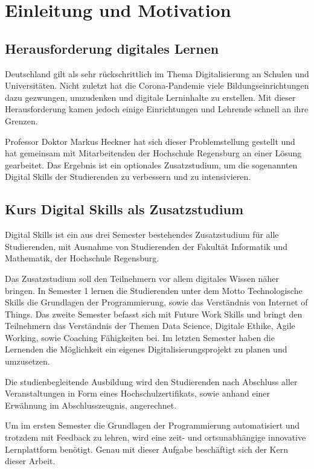 \section{Einleitung und Motivation}\label{einleitung}
\subsection{Herausforderung digitales Lernen}\label{herausforderung}
Deutschland gilt als sehr rückschrittlich im Thema Digitalisierung an Schulen
und Universitäten. Nicht zuletzt hat die Corona-Pandemie viele
Bildungseinrichtungen dazu gezwungen, umzudenken und digitale Lerninhalte
zu erstellen. Mit dieser Herausforderung kamen jedoch einige Einrichtungen und
Lehrende schnell an ihre Grenzen.

Professor Doktor Markus Heckner hat sich dieser Problemstellung gestellt und
hat gemeinsam mit Mitarbeitenden der Hochschule Regensburg an einer Lösung
gearbeitet. Das Ergebnis ist ein optionales Zusatzstudium, um die sogenannten
\glqq Digital Skills\grqq{} der Studierenden zu verbessern und zu intensivieren. 

\subsection{Kurs Digital Skills als Zusatzstudium}\label{kurs-digital-skills}
Digital Skills ist ein aus drei Semester bestehendes Zusatzstudium für alle
Studierenden, mit Ausnahme von Studierenden der Fakultät Informatik und
Mathematik, der Hochschule Regensburg.

Das Zusatzstudium soll den Teilnehmern vor allem digitales Wissen näher bringen.
In Semester 1 lernen die Studierenden unter dem Motto
\glqq Technologische Skills\grqq{} die Grundlagen der Programmierung, sowie das Verständnis von Internet of Things. Das zweite Semester befasst sich mit
\glqq Future Work Skills\grqq{} und bringt den Teilnehmern das Verständnis der
Themen Data Science, Digitale Ethike, Agile Working, sowie Coaching Fähigkeiten
bei. Im letzten Semester haben die Lernenden die Möglichkeit ein eigenes Digitalisierungsprojekt zu planen und umzusetzen.

Die studienbegleitende Ausbildung wird den Studierenden nach Abschluss aller
Veranstaltungen in Form eines Hochschulzertifikats, sowie anhand einer Erwähnung
im Abschlusszeugnis, angerechnet.

Um im ersten Semester die Grundlagen der Programmierung automatisiert und
trotzdem mit Feedback zu lehren, wird eine zeit- und ortsunabhängige innovative
Lernplattform benötigt. Genau mit dieser Aufgabe beschäftigt sich der Kern
dieser Arbeit.

